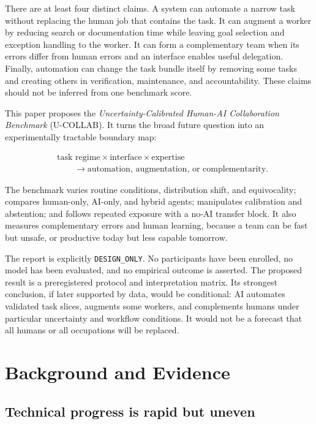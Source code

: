 \documentclass[conference]{IEEEtran}
\begin{document}
There are at least four distinct claims. A system can automate a narrow task without replacing the human job that contains the task. It can augment a worker by reducing search or documentation time while leaving goal selection and exception handling to the worker. It can form a complementary team when its errors differ from human errors and an interface enables useful delegation. Finally, automation can change the task bundle itself by removing some tasks and creating others in verification, maintenance, and accountability. These claims should not be inferred from one benchmark score.

This paper proposes the \emph{Uncertainty-Calibrated Human-AI Collaboration Benchmark} (U-COLLAB). It turns the broad future question into an experimentally tractable boundary map:

\begin{equation}
\begin{aligned}
&\text{task regime}\times\text{interface}\times\text{expertise}\\
&\qquad\longrightarrow \text{automation, augmentation, or complementarity}.
\end{aligned}
\end{equation}

The benchmark varies routine conditions, distribution shift, and equivocality; compares human-only, AI-only, and hybrid agents; manipulates calibration and abstention; and follows repeated exposure with a no-AI transfer block. It also measures complementary errors and human learning, because a team can be fast but unsafe, or productive today but less capable tomorrow.

The report is explicitly \texttt{DESIGN\_ONLY}. No participants have been enrolled, no model has been evaluated, and no empirical outcome is asserted. The proposed result is a preregistered protocol and interpretation matrix. Its strongest conclusion, if later supported by data, would be conditional: AI automates validated task slices, augments some workers, and complements humans under particular uncertainty and workflow conditions. It would not be a forecast that all humans or all occupations will be replaced.

\section{Background and Evidence}

\subsection{Technical progress is rapid but uneven}
\end{document}
